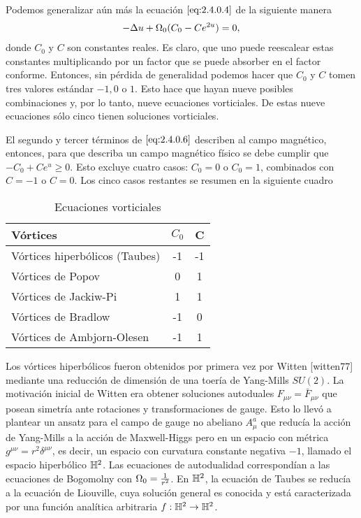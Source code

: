 Podemos generalizar aún más la ecuación $\eqref{eq:2.4.0.4}$ de la siguiente manera
\begin{align}
    -\Delta u+\Omega_0(C_0-Ce^{2u}) =0, \label{eq:2.4.0.6}
\end{align}
donde $C_0$ y $C$ son constantes reales. Es claro, que uno puede reescalear estas constantes multiplicando por un factor que se puede absorber en el factor conforme. Entonces, sin pérdida de generalidad podemos hacer que $C_0$ y $C$ tomen tres valores estándar $-1,0$ o $1$. Esto hace que hayan nueve posibles combinaciones y, por lo tanto, nueve ecuaciones vorticiales.  De estas nueve ecuaciones sólo cinco tienen soluciones vorticiales.

El segundo y tercer términos de $\eqref{eq:2.4.0.6}$ describen al campo magnético, entonces, para que describa un campo magnético físico se debe cumplir que $-C_0+C e^{u}\geq 0$. Esto excluye cuatro casos: $C_0=0$ o $C_0=1$, combinados con $C=-1$ o $C=0$. Los cinco casos restantes se resumen en la siguiente cuadro
\begin{table}[ht]
    \centering
    \begin{tabular}{l|c|c}
        Vórtices & $C_0$ & C \\ \hline
        Vórtices hiperbólicos (Taubes) & -1 & -1\\
        Vórtices de Popov & 0 & 1\\
        Vórtices de Jackiw-Pi & 1 & 1\\
        Vórtices de Bradlow & -1 & 0\\
        Vórtices de Ambjorn-Olesen & -1 & 1\\ \hline
    \end{tabular}
    \caption{Ecuaciones vorticiales}
    \label{tab:vortex}
\end{table}

Los vórtices hiperbólicos fueron obtenidos por primera vez por Witten [witten77] mediante una reducción de dimensión de una toería de Yang-Mills $SU(2)$. La motivación inicial de Witten era obtener soluciones autoduales $F_{\mu\nu}=\bar F_{\mu\nu}$ que posean simetría ante rotaciones y transformaciones de gauge. Esto lo llevó a plantear un ansatz para el campo de gauge no abeliano $A_\mu^a$ que reducía la acción de Yang-Mills a la acción de Maxwell-Higgs pero en un espacio con métrica $g^{\mu\nu}=r^2\delta^{\mu\nu}$, es decir, un espacio con curvatura constante negativa $-1$, llamado el espacio hiperbólico $\mathbb{H}^2$. Las ecuaciones de autodualidad correspondían a las ecuaciones de Bogomolny con $\Omega_0=\frac{1}{r^2}$. En $\mathbb{H}^2$, la ecuación de Taubes se reducía a la ecuación de Liouville, cuya solución general es conocida y está caracterizada por una función analítica arbitraria $f:\mathbb{H}^2\rightarrow\mathbb{H}^2$.

